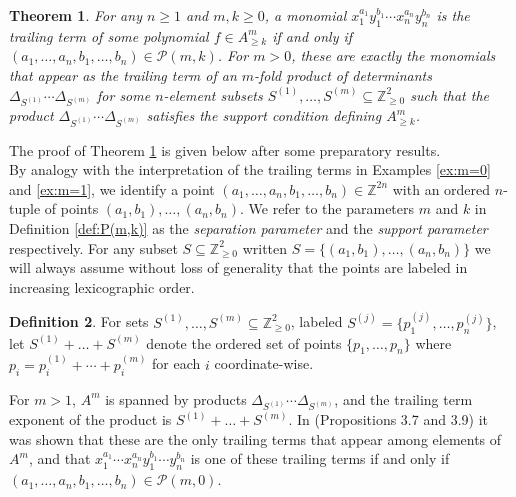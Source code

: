 \documentclass[12pt]{amsart}
\newcommand{\Z}{\mathbb{Z}}
\numberwithin{equation}{section}
\newtheorem{theorem}{Theorem}[section]
\theoremstyle{definition}
\newtheorem{definition}[theorem]{Definition}
\begin{document}
\begin{theorem}\label{thm:blowuptrailingterms}
    For any $n\geq 1$ and $m,k\geq 0$, a monomial $x_1^{a_1}y_1^{b_1}\cdots x_n^{a_n}y_n^{b_n}$ is the trailing term of some polynomial $f \in A^m_{\geq k}$ if and only if $(a_1,\dots,a_n,b_1,\dots,b_n)\in \mathcal{P}(m,k)$.
    For $m>0$, these are exactly the monomials that appear as the trailing term of an $m$-fold product of determinants $\Delta_{S^{(1)}}\cdots \Delta_{S^{(m)}}$ for some $n$-element subsets $S^{(1)},\dots,S^{(m)}\subseteq \Z^2_{\geq 0}$ such that the product $\Delta_{S^{(1)}}\cdots \Delta_{S^{(m)}}$ satisfies the support condition defining $A^m_{\geq k}$.
\end{theorem}

The proof of Theorem \ref{thm:blowuptrailingterms} is given below after some preparatory results. \\

By analogy with the interpretation of the trailing terms in Examples \ref{ex:m=0} and \ref{ex:m=1}, we identify a point $(a_1,\dots,a_n,b_1,\dots,b_n)\in \Z^{2n}$ with an ordered $n$-tuple of points $(a_1,b_1),\dots,(a_n,b_n)$. We refer to the parameters $m$ and $k$ in Definition \ref{def:P(m,k)} as the \textit{separation parameter} and the \textit{support parameter} respectively. For any subset $S\subseteq \Z^2_{\geq 0}$ written $S = \{(a_1,b_1),\dots,(a_n,b_n)\}$ we will always assume without loss of generality that the points are labeled in increasing lexicographic order. 

\begin{definition}
    For sets $S^{(1)},\dots,S^{(m)}\subseteq \Z^2_{\geq 0}$, labeled $S^{(j)} = \{ p^{(j)}_1,\dots,p_n^{(j)}\}$, let $S^{(1)}+\dots+S^{(m)}$ denote the ordered set of points $\{p_1,\dots,p_n\}$ where $p_i = p_i^{(1)}+\cdots+p_i^{(m)}$ for each $i$ coordinate-wise.
\end{definition}

For $m>1$, $A^m$ is spanned by products $\Delta_{S^{(1)}}\cdots \Delta_{S^{(m)}}$, and the trailing term exponent of the product is $S^{(1)}+\dots+S^{(m)}$. In \cite{C} (Propositions 3.7 and 3.9) it was shown that these are the only trailing terms that appear among elements of $A^m$, and that $x_1^{a_1}\cdots x_n^{a_n}y_1^{b_1}\cdots y_n^{b_n}$ is one of these trailing terms if and only if $(a_1,\dots,a_n,b_1,\dots,b_n)\in \mathcal{P}(m,0)$.
\end{document}
